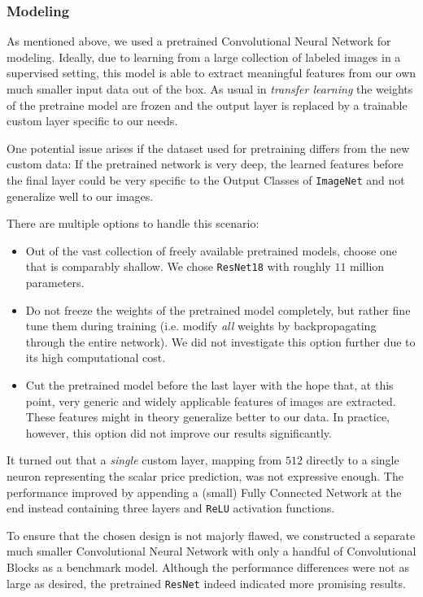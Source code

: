 \documentclass[12pt, letterpaper]{article}
\begin{document}
\subsubsection{Modeling}

As mentioned above, we used a pretrained Convolutional Neural Network for modeling.
Ideally, due to learning from a large collection of labeled images in a supervised setting, this model is able to extract meaningful features from our own much smaller input data out of the box.
As usual in \emph{transfer learning} the weights of the pretraine model are frozen and the output layer is replaced by a trainable custom layer specific to our needs.

One potential issue arises if the dataset used for pretraining differs from the new custom data:
If the pretrained network is very deep, the learned features before the final layer could be very specific to the Output Classes of \texttt{ImageNet} and not generalize well to our images.

There are multiple options to handle this scenario:
\begin{itemize}
    \item Out of the vast collection of freely available pretrained models, choose one that is comparably shallow.
          We chose \texttt{ResNet18} with roughly $11$ million parameters.
    \item Do not freeze the weights of the pretrained model completely, but rather fine tune them during training (i.e. modify \emph{all} weights by backpropagating through the entire network).
          We did not investigate this option further due to its high computational cost.
    \item Cut the pretrained model before the last layer with the hope that, at this point, very generic and widely applicable features of images are extracted.
          These features might in theory generalize better to our data.
          In practice, however, this option did not improve our results significantly.
\end{itemize}

It turned out that a \emph{single} custom layer, mapping from $512$ directly to a single neuron representing the scalar price prediction, was not expressive enough.
The performance improved by appending a (small) Fully Connected Network at the end instead containing three layers and \texttt{ReLU} activation functions.

To ensure that the chosen design is not majorly flawed, we constructed a separate much smaller Convolutional Neural Network with only a handful of Convolutional Blocks as a benchmark model.
Although the performance differences were not as large as desired, the pretrained \texttt{ResNet} indeed indicated more promising results.
\end{document}
